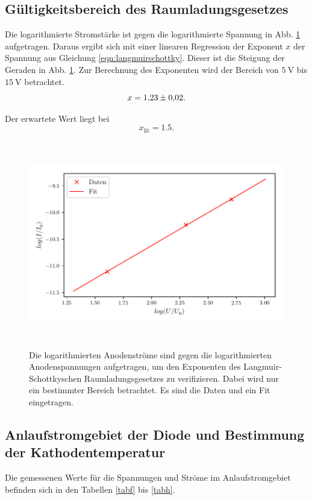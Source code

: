 \subsection{Gültigkeitsbereich des Raumladungsgesetzes}
Die logarithmierte Stromstärke ist gegen die logarithmierte
Spannung in Abb. \ref{fig:plot2} aufgetragen. %
Daraus ergibt sich mit einer linearen Regression der
Exponent $x$ der Spannung aus Gleichung \eqref{eqn:langmuirschottky}.
Dieser ist die Steigung der Geraden in Abb. \ref{fig:plot2}.
Zur Berechnung des Exponenten wird der Bereich von $\SI{5}{\volt}$ bis $\SI{15}{\volt}$ betrachtet. 
\begin{equation*}
    x = \num{1.23 \pm 0.02}.
\end{equation*}

\noindent Der erwartete Wert liegt bei 
\begin{equation*}
    x_\text{lit} = \num{1.5}.
\end{equation*}


\begin{figure}
    \centering
    \includegraphics[width=15cm, height=9cm]{build/plot2.pdf}
    \caption{Die logarithmierten Anodenströme sind gegen die logarithmierten
    Anodenspannungen aufgetragen, um den Exponenten des Langmuir-Schottkyschen
    Raumladungsgesetzes zu verifizieren. Dabei wird nur ein bestimmter
    Bereich betrachtet. Es sind die Daten und ein Fit eingetragen.}
    \label{fig:plot2}
\end{figure}


\subsection{Anlaufstromgebiet der Diode und Bestimmung der Kathodentemperatur}
Die gemessenen Werte für die Spannungen und Ströme im Anlaufstromgebiet
befinden sich in den Tabellen \ref{tabf} bis \ref{tabh}.

